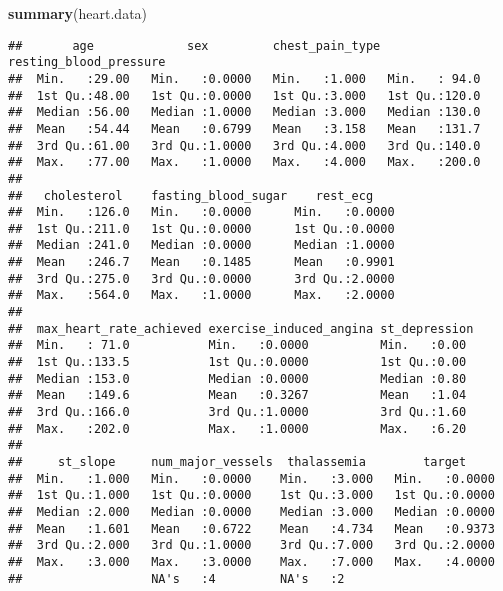 \documentclass[]{article}
\newenvironment{Shaded}{\begin{snugshade}}{\end{snugshade}}
\newcommand{\KeywordTok}[1]{\textcolor[rgb]{0.13,0.29,0.53}{\textbf{#1}}}
\newcommand{\NormalTok}[1]{#1}
\begin{document}
\begin{Shaded}
\begin{Highlighting}[]
\KeywordTok{summary}\NormalTok{(heart.data)}
\end{Highlighting}
\end{Shaded}

\begin{verbatim}
##       age             sex         chest_pain_type resting_blood_pressure
##  Min.   :29.00   Min.   :0.0000   Min.   :1.000   Min.   : 94.0         
##  1st Qu.:48.00   1st Qu.:0.0000   1st Qu.:3.000   1st Qu.:120.0         
##  Median :56.00   Median :1.0000   Median :3.000   Median :130.0         
##  Mean   :54.44   Mean   :0.6799   Mean   :3.158   Mean   :131.7         
##  3rd Qu.:61.00   3rd Qu.:1.0000   3rd Qu.:4.000   3rd Qu.:140.0         
##  Max.   :77.00   Max.   :1.0000   Max.   :4.000   Max.   :200.0         
##                                                                         
##   cholesterol    fasting_blood_sugar    rest_ecg     
##  Min.   :126.0   Min.   :0.0000      Min.   :0.0000  
##  1st Qu.:211.0   1st Qu.:0.0000      1st Qu.:0.0000  
##  Median :241.0   Median :0.0000      Median :1.0000  
##  Mean   :246.7   Mean   :0.1485      Mean   :0.9901  
##  3rd Qu.:275.0   3rd Qu.:0.0000      3rd Qu.:2.0000  
##  Max.   :564.0   Max.   :1.0000      Max.   :2.0000  
##                                                      
##  max_heart_rate_achieved exercise_induced_angina st_depression 
##  Min.   : 71.0           Min.   :0.0000          Min.   :0.00  
##  1st Qu.:133.5           1st Qu.:0.0000          1st Qu.:0.00  
##  Median :153.0           Median :0.0000          Median :0.80  
##  Mean   :149.6           Mean   :0.3267          Mean   :1.04  
##  3rd Qu.:166.0           3rd Qu.:1.0000          3rd Qu.:1.60  
##  Max.   :202.0           Max.   :1.0000          Max.   :6.20  
##                                                                
##     st_slope     num_major_vessels  thalassemia        target      
##  Min.   :1.000   Min.   :0.0000    Min.   :3.000   Min.   :0.0000  
##  1st Qu.:1.000   1st Qu.:0.0000    1st Qu.:3.000   1st Qu.:0.0000  
##  Median :2.000   Median :0.0000    Median :3.000   Median :0.0000  
##  Mean   :1.601   Mean   :0.6722    Mean   :4.734   Mean   :0.9373  
##  3rd Qu.:2.000   3rd Qu.:1.0000    3rd Qu.:7.000   3rd Qu.:2.0000  
##  Max.   :3.000   Max.   :3.0000    Max.   :7.000   Max.   :4.0000  
##                  NA's   :4         NA's   :2
\end{verbatim}
\end{document}
